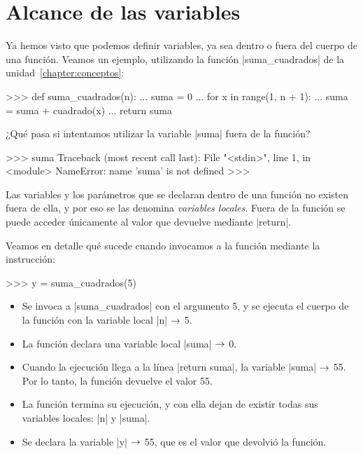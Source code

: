 \section{Alcance de las variables}

Ya hemos visto que podemos definir variables, ya sea dentro o fuera del cuerpo
de una función. Veamos un ejemplo, utilizando la función |suma_cuadrados| de la
unidad~\ref{chapter:conceptos}:

\begin{codigo-python-sn}
>>> def suma_cuadrados(n):
...     suma = 0
...     for x in range(1, n + 1):
...         suma = suma + cuadrado(x)
...     return suma
\end{codigo-python-sn}

¿Qué pasa si intentamos utilizar la variable |suma| fuera de la función?

\begin{codigo-python-sn}
>>> suma
Traceback (most recent call last):
  File "<stdin>", line 1, in <module>
NameError: name 'suma' is not defined
>>>
\end{codigo-python-sn}

\begin{observacion}
Las variables y los parámetros que se declaran dentro de una función no existen
fuera de ella, y por eso se las denomina \emph{variables locales}. Fuera de la
función se puede acceder únicamente al valor que devuelve mediante |return|.
\end{observacion}

Veamos en detalle qué sucede cuando invocamos a la función mediante la
instrucción:

\begin{codigo-python-sn}
>>> y = suma_cuadrados(5)
\end{codigo-python-sn}

\begin{itemize}
\item Se invoca a |suma_cuadrados| con el argumento 5, y se ejecuta
    el cuerpo de la función con la variable local |n| $\rightarrow$ 5.
\item La función declara una variable local |suma| $\rightarrow$ 0.
\item Cuando la ejecución llega a la línea |return suma|, la variable |suma|
    $\rightarrow$ 55. Por lo tanto, la función devuelve el valor 55.
\item La función termina su ejecución, y con ella dejan de existir todas sus
    variables locales: |n| y |suma|.
\item Se declara la variable |y| $\rightarrow$ 55, que es el valor que devolvió la
    función.
\end{itemize}

